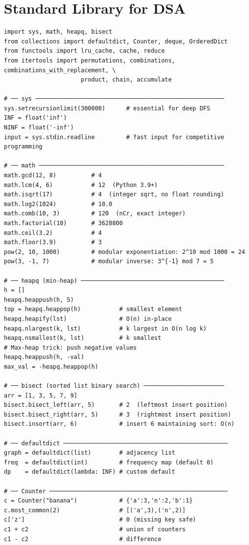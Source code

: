 \documentclass[11pt,a4paper]{report}
\begin{document}
\section{Standard Library for DSA}

\begin{lstlisting}
import sys, math, heapq, bisect
from collections import defaultdict, Counter, deque, OrderedDict
from functools import lru_cache, cache, reduce
from itertools import permutations, combinations, combinations_with_replacement, \
                      product, chain, accumulate

# ── sys ──────────────────────────────────────────────────────
sys.setrecursionlimit(300000)      # essential for deep DFS
INF = float('inf')
NINF = float('-inf')
input = sys.stdin.readline         # fast input for competitive programming

# ── math ─────────────────────────────────────────────────────
math.gcd(12, 8)          # 4
math.lcm(4, 6)           # 12  (Python 3.9+)
math.isqrt(17)           # 4  (integer sqrt, no float rounding)
math.log2(1024)          # 10.0
math.comb(10, 3)         # 120  (nCr, exact integer)
math.factorial(10)       # 3628800
math.ceil(3.2)           # 4
math.floor(3.9)          # 3
pow(2, 10, 1000)         # modular exponentiation: 2^10 mod 1000 = 24
pow(3, -1, 7)            # modular inverse: 3^{-1} mod 7 = 5

# ── heapq (min-heap) ─────────────────────────────────────────
h = []
heapq.heappush(h, 5)
top = heapq.heappop(h)           # smallest element
heapq.heapify(lst)               # O(n) in-place
heapq.nlargest(k, lst)           # k largest in O(n log k)
heapq.nsmallest(k, lst)          # k smallest
# Max-heap trick: push negative values
heapq.heappush(h, -val)
max_val = -heapq.heappop(h)

# ── bisect (sorted list binary search) ───────────────────────
arr = [1, 3, 5, 7, 9]
bisect.bisect_left(arr, 5)       # 2  (leftmost insert position)
bisect.bisect_right(arr, 5)      # 3  (rightmost insert position)
bisect.insort(arr, 6)            # insert 6 maintaining sort: O(n)

# ── defaultdict ───────────────────────────────────────────────
graph = defaultdict(list)        # adjacency list
freq  = defaultdict(int)         # frequency map (default 0)
dp    = defaultdict(lambda: INF) # custom default

# ── Counter ───────────────────────────────────────────────────
c = Counter("banana")            # {'a':3,'n':2,'b':1}
c.most_common(2)                 # [('a',3),('n',2)]
c['z']                           # 0 (missing key safe)
c1 + c2                          # union of counters
c1 - c2                          # difference


\end{lstlisting}
\end{document}

